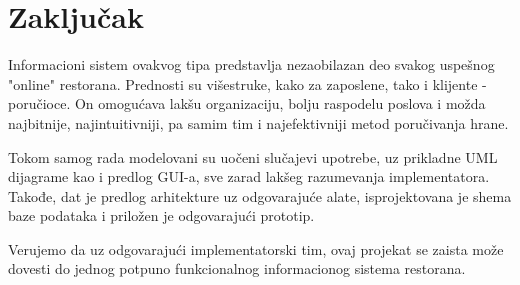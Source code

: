 \newpage
\section{Zaključak}
Informacioni sistem ovakvog tipa predstavlja nezaobilazan deo svakog uspešnog "online" restorana. Prednosti su višestruke, kako za zaposlene, tako i klijente - poručioce. On omogućava lakšu organizaciju, bolju raspodelu poslova i možda najbitnije, najintuitivniji, pa samim tim i najefektivniji metod poručivanja hrane.

Tokom samog rada modelovani su uočeni slučajevi upotrebe, uz prikladne UML dijagrame kao i predlog GUI-a, sve zarad lakšeg razumevanja implementatora. Takođe, dat je predlog arhitekture uz odgovarajuće alate, isprojektovana je shema baze podataka i priložen je odgovarajući prototip.

Verujemo da uz odgovarajući implementatorski tim, ovaj projekat se zaista može dovesti do jednog potpuno funkcionalnog informacionog sistema restorana.

